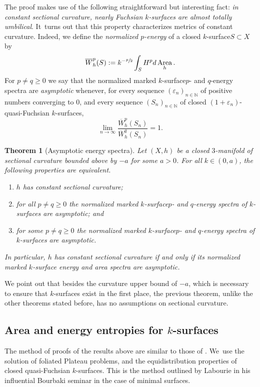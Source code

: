 \documentclass[10pt]{amsart}
\newcommand{\ksurface}{$k$\nobreakdash-surface\xspace}
\newcommand{\ksurfaces}{$k$\nobreakdash-surfaces\xspace}
\theoremstyle{plain}
\newtheorem{theorem}{Theorem}[section]
\theoremstyle{definition}
\newcommand{\N}{{\mathbb N}}
\let\eps\varepsilon
\let\dans\subset
\DeclareMathOperator{\Area}{Area}
\begin{document}
The proof makes use of the following straightforward but interesting fact: \emph{in constant sectional curvature, nearly Fuchsian \ksurfaces are almost totally umbilical}. It~turns out that this property characterizes metrics of constant curvature. Indeed, we define the \emph{normalized $p$-energy} of a closed \ksurface $S\dans X$ by
\begin{equation*}
\overline{W}^{p}_h(S) := k^{-\sfrac{p}{2}}\int_S H^p d\Area_h.
\end{equation*}
For $p\neq q\geq 0$ we say that the normalized marked \ksurface $p$- and $q$-energy spectra are \emph{asymptotic} whenever, for every sequence $(\eps_n)_{n\in\N}$ of positive numbers converging to $0$, and every sequence $(S_n)_{n\in\N}$ of closed $(1+\eps_n)$-quasi-Fuchsian \ksurfaces,
\begin{equation*}
\lim_{n\to\infty}\frac{\overline{W}^{p}_h(S_n)}{\overline{W}^{q}_h(S_n)}=1.
\end{equation*}

\begin{theorem}[Asymptotic energy spectra]\label{thm.asymptotic_spectra}
Let $(X,h)$ be a closed $3$\nobreakdash-manifold of sectional curvature bounded above by $-a$ for some $a>0$. For all $k\in(0,a)$, the following properties are equivalent.
\begin{enumerate}
\item $h$ has constant sectional curvature;
\item for all $p\neq q\geq 0$ the normalized marked \ksurface $p$- and $q$-energy spectra of \ksurfaces are asymptotic; and
\item for some $p\neq q\geq 0$ the normalized marked \ksurface $p$- and $q$-energy spectra of \ksurfaces are asymptotic.
\end{enumerate}
\noindent In particular, $h$ has constant sectional curvature if and only if its normalized marked \ksurface energy and area spectra are asymptotic.
\end{theorem}

We point out that besides the curvature upper bound of $-a$, which is necessary to ensure that \ksurfaces exist in the first place, the previous theorem, unlike the other theorems stated before, has no assumptions on sectional curvature.

\subsection{Area and energy entropies for \ksurfaces} The method of proofs of the results above are similar to those of \cite{ALS}. We~use the solution of foliated Plateau problems, and the equidistribution properties of closed quasi-Fuchsian \ksurfaces. This is the method outlined by Labourie in his influential Bourbaki seminar \cite{LabourieBourbaki} in the case of minimal surfaces.
\end{document}
